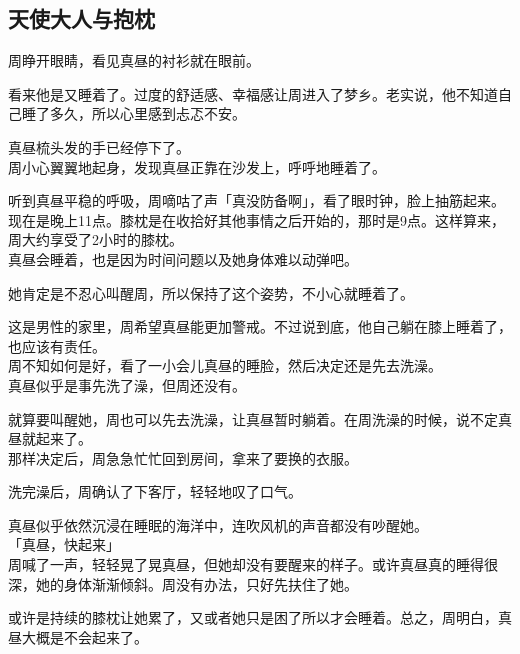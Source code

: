 \subsection{天使大人与抱枕}

周睁开眼睛，看见真昼的衬衫就在眼前。

看来他是又睡着了。过度的舒适感、幸福感让周进入了梦乡。老实说，他不知道自己睡了多久，所以心里感到忐忑不安。

真昼梳头发的手已经停下了。\\

周小心翼翼地起身，发现真昼正靠在沙发上，呼呼地睡着了。

听到真昼平稳的呼吸，周嘀咕了声「真没防备啊」，看了眼时钟，脸上抽筋起来。\\

现在是晚上11点。膝枕是在收拾好其他事情之后开始的，那时是9点。这样算来，周大约享受了2小时的膝枕。\\

真昼会睡着，也是因为时间问题以及她身体难以动弹吧。

她肯定是不忍心叫醒周，所以保持了这个姿势，不小心就睡着了。

这是男性的家里，周希望真昼能更加警戒。不过说到底，他自己躺在膝上睡着了，也应该有责任。\\

周不知如何是好，看了一小会儿真昼的睡脸，然后决定还是先去洗澡。\\

真昼似乎是事先洗了澡，但周还没有。

就算要叫醒她，周也可以先去洗澡，让真昼暂时躺着。在周洗澡的时候，说不定真昼就起来了。\\

那样决定后，周急急忙忙回到房间，拿来了要换的衣服。\\

\vspace{2\baselineskip}

洗完澡后，周确认了下客厅，轻轻地叹了口气。

真昼似乎依然沉浸在睡眠的海洋中，连吹风机的声音都没有吵醒她。\\

「真昼，快起来」\\

周喊了一声，轻轻晃了晃真昼，但她却没有要醒来的样子。或许真昼真的睡得很深，她的身体渐渐倾斜。周没有办法，只好先扶住了她。

或许是持续的膝枕让她累了，又或者她只是困了所以才会睡着。总之，周明白，真昼大概是不会起来了。\\

